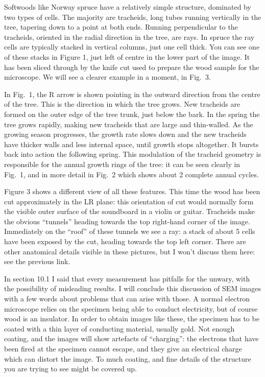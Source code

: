   Softwoods like Norway spruce have a relatively simple structure, dominated by 
  two types of cells. The majority are tracheids, long tubes running vertically 
  in the tree, tapering down to a point at both ends. Running perpendicular to 
  the tracheids, oriented in the radial direction in the tree, are rays. In 
  spruce the ray cells are typically stacked in vertical columns, just one cell 
  thick. You can see one of these stacks in Figure 1, just left of centre in 
  the lower part of the image. It has been sliced through by the knife cut used 
  to prepare the wood sample for the microscope. We will see a clearer example 
  in a moment, in Fig.\ 3. 

  In Fig.\ 1, the R arrow is shown pointing in the outward direction from the 
  centre of the tree. This is the direction in which the tree grows. New 
  tracheids are formed on the outer edge of the tree trunk, just below the 
  bark. In the spring the tree grows rapidly, making new tracheids that are 
  large and thin-walled. As the growing season progresses, the growth rate 
  slows down and the new tracheids have thicker walls and less internal space, 
  until growth stops altogether. It bursts back into action the following 
  spring. This modulation of the tracheid geometry is responsible for the 
  annual growth rings of the tree: it can be seen clearly in Fig.\ 1, and in 
  more detail in Fig.\ 2 which shows about 2 complete annual cycles. 

  Figure 3 shows a different view of all these features. This time the wood has 
  been cut approximately in the LR plane: this orientation of cut would 
  normally form the visible outer surface of the soundboard in a violin or 
  guitar. Tracheids make the obvious “tunnels” heading towards the top 
  right-hand corner of the image. Immediately on the ``roof'' of these tunnels 
  we see a ray: a stack of about 5 cells have been exposed by the cut, heading 
  towards the top left corner. There are other anatomical details visible in 
  these pictures, but I won't discuss them here: see the previous link. 

  In section 10.1 I said that every measurement has pitfalls for the unwary, 
  with the possibility of misleading results. I will conclude this discussion 
  of SEM images with a few words about problems that can arise with those. A 
  normal electron microscope relies on the specimen being able to conduct 
  electricity, but of course wood is an insulator. In order to obtain images 
  like these, the specimen has to be coated with a thin layer of conducting 
  material, usually gold. Not enough coating, and the images will show 
  artefacts of ``charging'': the electrons that have been fired at the specimen 
  cannot escape, and they give an electrical charge which can distort the 
  image. To much coating, and fine details of the structure you are trying to 
  see might be covered up. 

